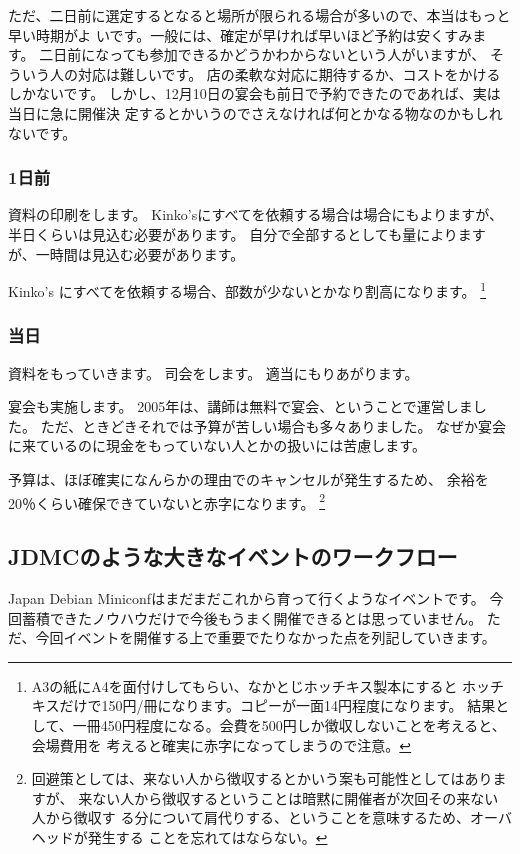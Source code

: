 \documentclass[mingoth,a4paper]{jsarticle}
\begin{document}
ただ、二日前に選定するとなると場所が限られる場合が多いので、本当はもっと早い時期がよ
いです。一般には、確定が早ければ早いほど予約は安くすみます。
二日前になっても参加できるかどうかわからないという人がいますが、
そういう人の対応は難しいです。
店の柔軟な対応に期待するか、コストをかけるしかないです。
しかし、12月10日の宴会も前日で予約できたのであれば、実は当日に急に開催決
定するとかいうのでさえなければ何とかなる物なのかもしれないです。

\subsubsection{1日前}

資料の印刷をします。
Kinko'sにすべてを依頼する場合は場合にもよりますが、半日くらいは見込む必要があります。
自分で全部するとしても量によりますが、一時間は見込む必要があります。

Kinko's にすべてを依頼する場合、部数が少ないとかなり割高になります。
\footnote{A3の紙にA4を面付けしてもらい、なかとじホッチキス製本にすると
ホッチキスだけで150円/冊になります。コピーが一面14円程度になります。
結果として、一冊450円程度になる。会費を500円しか徴収しないことを考えると、会場費用を
考えると確実に赤字になってしまうので注意。}

\subsubsection{当日}

資料をもっていきます。
司会をします。
適当にもりあがります。

宴会も実施します。
2005年は、講師は無料で宴会、ということで運営しました。
ただ、ときどきそれでは予算が苦しい場合も多々ありました。
なぜか宴会に来ているのに現金をもっていない人とかの扱いには苦慮します。

予算は、ほぼ確実になんらかの理由でのキャンセルが発生するため、
余裕を20％くらい確保できていないと赤字になります。
\footnote{
回避策としては、来ない人から徴収するとかいう案も可能性としてはありますが、
来ない人から徴収するということは暗黙に開催者が次回その来ない人から徴収す
る分について肩代りする、ということを意味するため、オーバヘッドが発生する
ことを忘れてはならない。
}


\subsection{JDMCのような大きなイベントのワークフロー}

Japan Debian Miniconfはまだまだこれから育って行くようなイベントです。
今回蓄積できたノウハウだけで今後もうまく開催できるとは思っていません。
ただ、今回イベントを開催する上で重要でたりなかった点を列記していきます。
\end{document}
